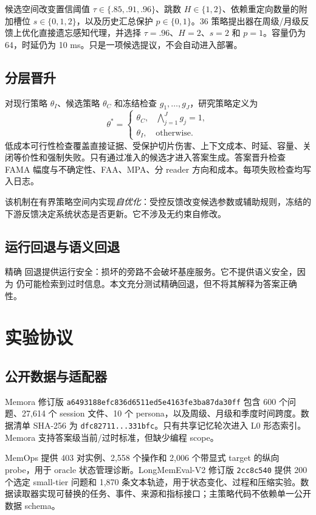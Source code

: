 \vtwo 候选空间改变置信阈值 $\tau\in\{.85,.91,.96\}$、跳数 $H\in\{1,2\}$、依赖重定向数量的附加槽位 $s\in\{0,1,2\}$，以及历史汇总保护 $p\in\{0,1\}$。36 策略提出器在周级/月级反馈上优化直接遗忘感知代理，并选择 $\tau=.96$、$H=2$、$s=2$ 和 $p=1$。容量仍为 64，时延仍为 10 ms。\vtwo 只是一项候选提议，不会自动进入部署。

\subsection{分层晋升}

对现行策略 $\theta_I$、候选策略 $\theta_C$ 和冻结检查 $g_1,\ldots,g_J$，研究策略定义为
\[
\theta^*=\begin{cases}
\theta_C,&\bigwedge_{j=1}^{J}g_j=1,\\
\theta_I,&\text{otherwise.}
\end{cases}
\]
低成本可行性检查覆盖直接证据、受保护切片伤害、上下文成本、时延、容量、关闭等价性和强制失败。只有通过准入的候选才进入答案生成。答案晋升检查 FAMA 幅度与不确定性、FAA、MPA、分 reader 方向和成本。每项失败检查均写入日志。

该机制在有界策略空间内实现\emph{自优化}：受控反馈改变候选参数或辅助规则，冻结的下游反馈决定系统状态是否更新。它不涉及无约束自修改。

\subsection{运行回退与语义回退}

精确 \base 回退提供运行安全：损坏的旁路不会破坏基座服务。它不提供语义安全，因为 \base 仍可能检索到过时信息。本文充分测试精确回退，但不将其解释为答案正确性。

\section{实验协议}

\subsection{公开数据与适配器}

Memora 修订版 \texttt{a6493188efc836d6\allowbreak 511ed5e4163fe3ba\allowbreak 87da30ff} 包含 600 个问题、27,614 个 session 文件、10 个 persona，以及周级、月级和季度时间跨度。数据清单 SHA-256 为 \texttt{dfc82711\allowbreak ...331bfc}。只有共享记忆轮次进入 L0 形态索引。Memora 支持答案级当前/过时标准，但缺少编程 scope。

MemOps 提供 403 对实例、2,558 个操作和 2,006 个带显式 target 的纵向 probe，用于 oracle 状态管理诊断。LongMemEval-V2 修订版 \texttt{2cc8c540} 提供 200 个选定 small-tier 问题和 1,870 条文本轨迹，用于状态变化、过程和压缩实验。数据读取器实现可替换的任务、事件、来源和指标接口；主策略代码不依赖单一公开数据 schema。

